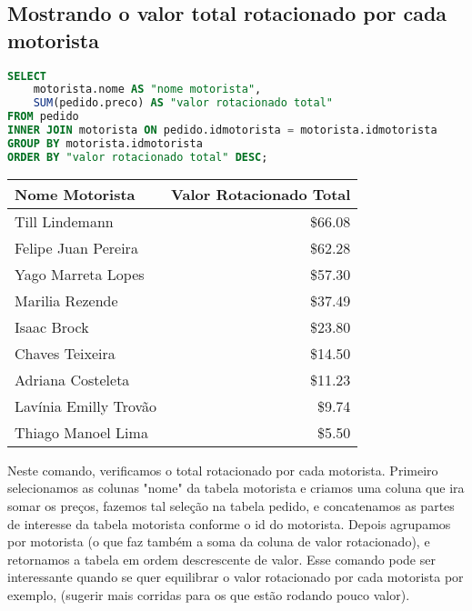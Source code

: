 \documentclass{article}
\begin{document}
\subsection{Mostrando o valor total rotacionado por cada motorista}
\begin{lstlisting}[language=SQL]
SELECT
    motorista.nome AS "nome motorista",
    SUM(pedido.preco) AS "valor rotacionado total"
FROM pedido
INNER JOIN motorista ON pedido.idmotorista = motorista.idmotorista
GROUP BY motorista.idmotorista
ORDER BY "valor rotacionado total" DESC;
\end{lstlisting}


\begin{table}[h]
\centering
\begin{tabular}{l|r}

\textbf{Nome Motorista} & \textbf{Valor Rotacionado Total} \\
\hline

Till Lindemann          &   \$66.08 \\
Felipe Juan Pereira     &   \$62.28 \\
Yago Marreta Lopes      &   \$57.30 \\
Marilia Rezende         &   \$37.49 \\
Isaac Brock             &   \$23.80 \\
Chaves Teixeira         &   \$14.50 \\
Adriana Costeleta       &   \$11.23 \\
Lavínia Emilly Trovão   &   \$9.74 \\
Thiago Manoel Lima      &   \$5.50 \\

\end{tabular}
\end{table}

Neste comando, verificamos o total rotacionado por cada motorista. Primeiro selecionamos as colunas "nome" da tabela motorista e criamos uma coluna que ira somar os preços, fazemos tal seleção na tabela pedido, e concatenamos as partes de interesse da tabela motorista conforme o id do motorista. Depois agrupamos por motorista (o que faz também a soma da coluna de valor rotacionado), e retornamos a tabela em ordem descrescente de valor. Esse comando pode ser interessante quando se quer equilibrar o valor rotacionado por cada motorista por exemplo, (sugerir mais corridas para os que estão rodando pouco valor).
\end{document}
